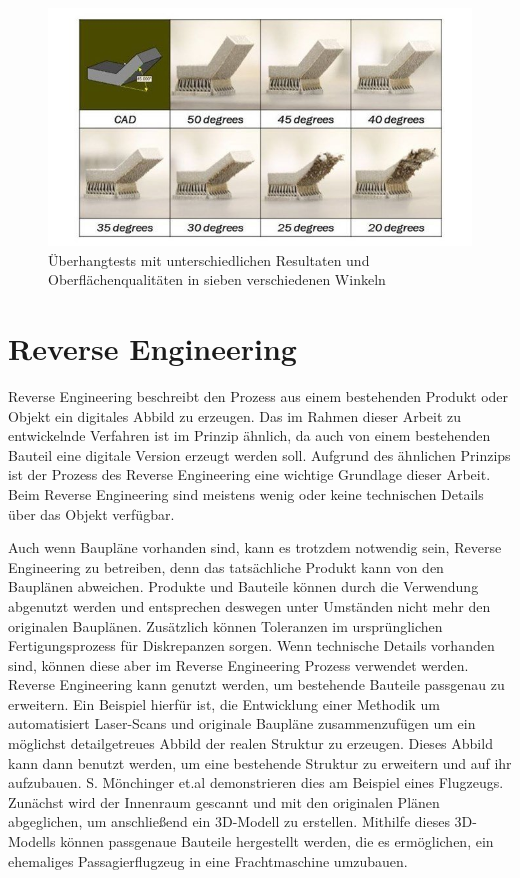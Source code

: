 \begin{figure}[H]
    \centering
    \includegraphics[width=0.9\linewidth]{images/Overhang-tests-showing-different-printabilities-and-finish-qualities-at-seven-different.jpg}
    \caption{Überhangtests mit unterschiedlichen Resultaten und 
    Oberflächenqualitäten in sieben verschiedenen Winkeln \cite{Meng.2020}}
    \label{fig:overhang}
\end{figure}

\section{Reverse Engineering}

Reverse Engineering beschreibt den Prozess aus einem bestehenden Produkt 
oder Objekt ein digitales Abbild zu erzeugen. Das im Rahmen dieser Arbeit
zu entwickelnde Verfahren ist im Prinzip ähnlich, 
da auch von einem bestehenden Bauteil eine digitale Version
erzeugt werden soll. Aufgrund des ähnlichen Prinzips ist der Prozess des Reverse Engineering
eine wichtige Grundlage dieser Arbeit.
Beim Reverse Engineering sind meistens wenig oder keine technischen Details
über das Objekt verfügbar.~\cite{Helle.2021}

Auch wenn Baupläne vorhanden sind, kann es trotzdem notwendig sein, 
Reverse Engineering zu betreiben, denn das tatsächliche Produkt kann von
den Bauplänen abweichen. Produkte und Bauteile können durch die Verwendung 
abgenutzt werden und entsprechen deswegen unter Umständen nicht mehr den originalen 
Bauplänen. Zusätzlich können Toleranzen im ursprünglichen Fertigungsprozess 
für Diskrepanzen sorgen. Wenn technische Details vorhanden sind,
können diese aber im Reverse Engineering Prozess verwendet werden. 
Reverse Engineering kann genutzt werden, um 
bestehende Bauteile passgenau zu erweitern. Ein Beispiel hierfür ist, die
Entwicklung einer Methodik um automatisiert Laser-Scans und originale Baupläne
zusammenzufügen um ein möglichst detailgetreues Abbild der realen Struktur zu
erzeugen. Dieses Abbild kann dann benutzt werden, um eine bestehende Struktur zu 
erweitern und auf ihr aufzubauen. S. Mönchinger et.al demonstrieren dies am Beispiel eines 
Flugzeugs. Zunächst wird der Innenraum gescannt und mit den originalen Plänen abgeglichen, 
um anschließend ein 3D-Modell zu erstellen. Mithilfe dieses 3D-Modells können passgenaue 
Bauteile hergestellt werden, die es ermöglichen, ein ehemaliges Passagierflugzeug in eine 
Frachtmaschine umzubauen.~\cite{Monchinger.2021}

